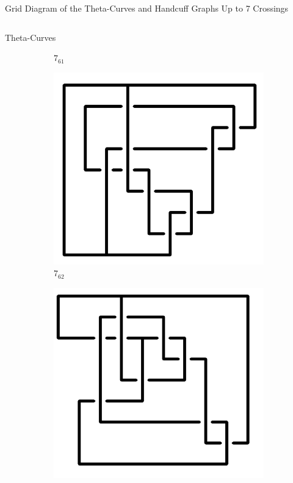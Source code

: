 \documentclass[final]{beamer}
\begin{document}
\begin{frame}[t]
\begin{alertblock}{Grid Diagram of the Theta-Curves and Handcuff Graphs Up to 7 Crossings}
\begin{columns}[t]
\begin{column}{0.5\textwidth}
\begin{alertblock}{Theta-Curves}
\begin{figure}
\begin{subfigure}{0.075\textwidth}
    \caption{$7_{61}$} 
    \end{subfigure}
    \begin{subfigure}{0.075\textwidth}
    \includegraphics[width=\columnwidth]{../Midterm_Poster/grid_diagram/theta_7_62.png}
    \caption{$7_{62}$} 
    \end{subfigure}
    \begin{subfigure}{0.075\textwidth}
    \includegraphics[width=\columnwidth]{../Midterm_Poster/grid_diagram/theta_7_63.png}

\end{subfigure}
\end{figure}
\end{alertblock}
\end{column}
\end{columns}
\end{alertblock}
\end{frame}
\end{document}
